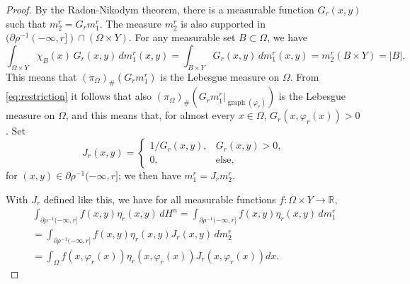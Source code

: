 \documentclass[10pt,a4paper]{amsart}
\newcommand{\R}{\mathbb{R}}
\newcommand{\proj}{\pi}
\newcommand{\projX}{\proj_{\Omega}}
\begin{document}
\begin{proof}
 By the Radon-Nikodym theorem, there is a measurable function $G_r(x,y)$ such that $m^r_2=G_rm^r_1$.
 The measure $m_2^r$ is also supported in $(\partial \rho^{-1}(-\infty,r])\cap(\Omega\times Y)$. For any measurable set $B\subset \Omega$, we have 
 \[\int_{\Omega\times Y}\chi_{B}(x)\,G_r(x,y)\,dm_1^r(x,y) =\int_{B\times Y}G_r(x,y)\,dm_1^r(x,y)=m_2^r(B\times Y)=|B|.\]
  This means that $(\projX)_\#(G_rm^r_1)$ is 
{the} Lebesgue measure on $\Omega$. From \eqref{eq:restriction} it follows that also $(\projX)_\#(G_rm^r_1|_{\operatorname{graph}(\varphi_r)})$ is 
{the} Lebesgue measure on $\Omega$, and this means that, for almost every $x\in \Omega$, $G_r(x,\varphi_r(x))>0$. Set
  \[J_r(x,y)=\begin{cases}1/G_r(x,y),&G_r(x,y)>0,\\0,&\text{else,}\end{cases}\]
  for $(x,y)\in \partial\rho^{-1}(-\infty,r]$; we then have $m_1^r=J_rm_2^r$.
 
 With $J_r$ defined like this, we have %
 for all measurable functions  $f\colon\Omega\times Y\to\R$, 
 \begin{multline}\label{eq:jacobian}
  \int_{\partial\rho^{-1}(-\infty,r]}f(x,y)\eta_r(x,y)\,dH^n=\int_{\partial\rho^{-1}(-\infty,r]}f(x,y)\eta_r(x,y)\,dm^r_1\\
  =\int_{\partial\rho^{-1}(-\infty,r]}f(x,y)\eta_r(x,y)J_r(x,y)\,dm_2^r\\=
  \int_\Omega f(x,\varphi_r(x))\eta_r(x,\varphi_r(x))J_r(x,\varphi_r(x))dx.
 \end{multline}


\end{proof}
\end{document}
